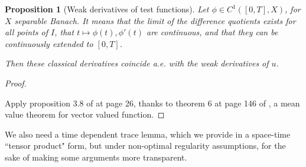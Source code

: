 \documentclass[english,a4paper,10pt,oneside]{scrbook}	%
\theoremstyle{break}
\newtheorem{prop}[equation]{Proposition}
\newenvironment{mproof}[1][\proofname]{%
  \begin{proof}[#1]$ $\par\nobreak\ignorespaces
}{%
  \end{proof}
}
\renewcommand*{\proofname}{Proof}
\theoremstyle{remark}
\newcommand{\emb}{\hookrightarrow}
\begin{document}
\begin{appendices}
%
%
%


\begin{prop}[Weak derivatives of test functions]
\label{prop:weak_class}
Let $\phi \in C^1([0,T],X)$, for $X$ separable Banach. It means that the limit of the difference quotients exists for all points of $I$, that $t\mapsto \phi(t), \phi'(t)$ are continuous, and that they can be continuously extended to $[0,T]$.

Then these classical derivatives coincide a.e. with the weak derivatives of $u$.

\end{prop}
\begin{mproof}


Apply proposition 3.8 of \cite{kreuter} at page 26, thanks to theorem 6 at page 146 of \cite{mvt}, a mean value theorem for vector valued function.
\end{mproof}

We also need a time dependent trace lemma, which we provide in a space-time ``tensor product" form, but under non-optimal regularity assumptions, for the sake of making some arguments more transparent.


\end{appendices}
\end{document}
